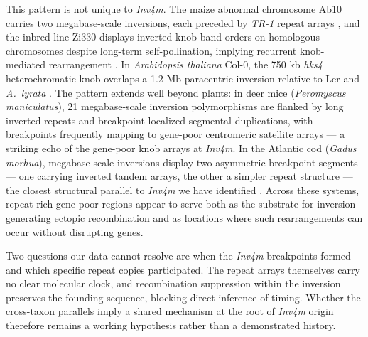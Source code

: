 \documentclass[9pt,twocolumn,twoside]{rilabRxiv}
\newcommand{\invfour}{\textit{Inv4m}\xspace}
\begin{document}
This pattern is not unique to \invfour.
The maize abnormal chromosome Ab10 carries two megabase-scale inversions, each preceded by \textit{TR-1} repeat arrays \citep{liu2020, mroczek2006}, and the inbred line Zi330 displays inverted knob-band orders on homologous chromosomes despite long-term self-pollination, implying recurrent knob-mediated rearrangement \citep{yang2012}.
In \textit{Arabidopsis thaliana} Col-0, the 750 kb \textit{hks4} heterochromatic knob overlaps a 1.2 Mb paracentric inversion relative to Ler and \textit{A.~lyrata} \citep{schmidt2020, fransz2000, zapata2016}.
The pattern extends well beyond plants: in deer mice (\textit{Peromyscus maniculatus}), 21 megabase-scale inversion polymorphisms are flanked by long inverted repeats and breakpoint-localized segmental duplications, with breakpoints frequently mapping to gene-poor centromeric satellite arrays --- a striking echo of the gene-poor knob arrays at \invfour \citep{Harringmeyer2022-kv, Gozashti2025-ya}.
In the Atlantic cod (\textit{Gadus morhua}), megabase-scale inversions display two asymmetric breakpoint segments --- one carrying inverted tandem arrays, the other a simpler repeat structure --- the closest structural parallel to \invfour we have identified \citep{araya2025}.
Across these systems, repeat-rich gene-poor regions appear to serve both as the substrate for inversion-generating ectopic recombination and as locations where such rearrangements can occur without disrupting genes.
 
Two questions our data cannot resolve are when the \invfour breakpoints formed and which specific repeat copies participated.
The repeat arrays themselves carry no clear molecular clock, and recombination suppression within the inversion preserves the founding sequence, blocking direct inference of timing.
Whether the cross-taxon parallels imply a shared mechanism at the root of \invfour origin therefore remains a working hypothesis rather than a demonstrated history.
\end{document}
